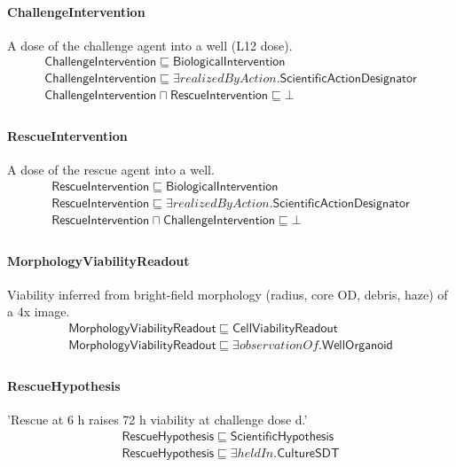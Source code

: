\documentclass[10pt]{article}
\begin{document}
\paragraph{ChallengeIntervention} A dose of the challenge agent into a well (L12 dose).
\[\begin{array}{l}
\mathsf{ChallengeIntervention} \sqsubseteq  \mathsf{BiologicalIntervention} \\
\mathsf{ChallengeIntervention} \sqsubseteq  \exists \mathit{realizedByAction}.\mathsf{ScientificActionDesignator} \\
\mathsf{ChallengeIntervention} \sqcap  \mathsf{RescueIntervention} \sqsubseteq  \bot  \\
\end{array}\]
\paragraph{RescueIntervention} A dose of the rescue agent into a well.
\[\begin{array}{l}
\mathsf{RescueIntervention} \sqsubseteq  \mathsf{BiologicalIntervention} \\
\mathsf{RescueIntervention} \sqsubseteq  \exists \mathit{realizedByAction}.\mathsf{ScientificActionDesignator} \\
\mathsf{RescueIntervention} \sqcap  \mathsf{ChallengeIntervention} \sqsubseteq  \bot  \\
\end{array}\]
\paragraph{MorphologyViabilityReadout} Viability inferred from bright-field morphology (radius, core OD, debris, haze) of a 4x image.
\[\begin{array}{l}
\mathsf{MorphologyViabilityReadout} \sqsubseteq  \mathsf{CellViabilityReadout} \\
\mathsf{MorphologyViabilityReadout} \sqsubseteq  \exists \mathit{observationOf}.\mathsf{WellOrganoid} \\
\end{array}\]
\paragraph{RescueHypothesis} 'Rescue at 6 h raises 72 h viability at challenge dose d.'
\[\begin{array}{l}
\mathsf{RescueHypothesis} \sqsubseteq  \mathsf{ScientificHypothesis} \\
\mathsf{RescueHypothesis} \sqsubseteq  \exists \mathit{heldIn}.\mathsf{CultureSDT} \\
\end{array}\]
\end{document}
